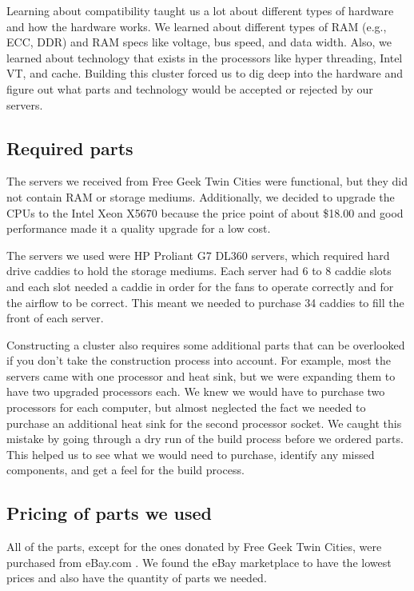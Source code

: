 \documentclass[12pt]{article}
\begin{document}
Learning about compatibility taught us a lot about different types of hardware and how the hardware works. We learned about different types of RAM (e.g., ECC, DDR) and RAM specs like voltage, bus speed, and data width. Also, we learned about technology that exists in the processors like hyper threading, Intel VT, and cache. Building this cluster forced us to dig deep into the hardware and figure out what parts and technology would be accepted or rejected by our servers.

\subsection{Required parts}

The servers we received from Free Geek Twin Cities were functional, but they did not contain RAM or storage mediums. Additionally, we decided to upgrade the CPUs to the Intel Xeon X5670 because the price point of about \$18.00 and good performance made it a quality upgrade for a low cost.

The servers we used were HP Proliant G7 DL360 servers, which required hard drive caddies to hold the storage mediums. Each server had 6 to 8 caddie slots and each slot needed a caddie in order for the fans to operate correctly and for the airflow to be correct. This meant we needed to purchase 34 caddies to fill the front of each server.

Constructing a cluster also requires some additional parts that can be overlooked if you don't take the construction process into account. For example, most the servers came with one processor and heat sink, but we were expanding them to have two upgraded processors each. We knew we would have to purchase two processors for each computer, but almost neglected the fact we needed to purchase an additional heat sink for the second processor socket. We caught this mistake by going through a dry run of the build process before we ordered parts. This helped us to see what we would need to purchase, identify any missed components, and get a feel for the build process.

\subsection{Pricing of parts we used}

All of the parts, except for the ones donated by Free Geek Twin Cities, were purchased from eBay.com \cite{eBay}. We found the eBay marketplace to have the lowest prices and also have the quantity of parts we needed.
\end{document}
